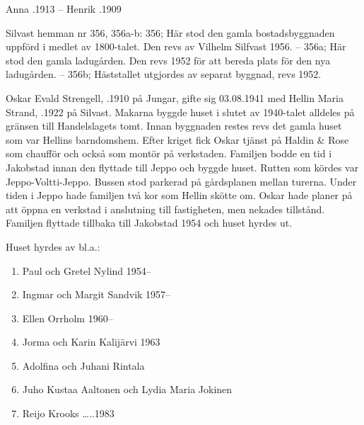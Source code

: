 Anna .1913  --  Henrik .1909

Silvast hemman nr 356, 356a-b:
356; Här stod den gamla bostadsbyggnaden uppförd i medlet av 1800-talet. Den revs av Vilhelm Silfvast 1956. -- 356a; Här stod den gamla ladugården. Den revs 1952 för att bereda plats för den nya ladugården. -- 356b; Häststallet utgjordes av separat byggnad, revs 1952.





Oskar Evald Strengell, .1910 på Jungar, gifte sig 03.08.1941 med Hellin Maria Strand, .1922 på Silvast. Makarna byggde huset i slutet av 1940-talet alldeles på gränsen till Handelslagets tomt. Innan byggnaden restes revs det gamla huset som var Hellins barndomshem. Efter kriget fick Oskar tjänst på Haldin \& Rose som chaufför och också som montör på verkstaden. Familjen bodde en tid i Jakobstad innan den flyttade till Jeppo och byggde huset. Rutten som kördes var Jeppo-Voltti-Jeppo. Bussen stod parkerad på gårdsplanen mellan turerna. Under tiden i Jeppo hade familjen två kor som Hellin skötte om. Oskar hade planer på att öppna en verkstad i anslutning till fastigheten, men nekades tillstånd. Familjen flyttade tillbaka till Jakobstad 1954 och huset hyrdes ut.
\begin{jhchildren}
  \item {}
  \item {}
\end{jhchildren}


Huset hyrdes av bl.a.:
\begin{enumerate}
  \item Paul och Gretel Nylind  1954--
  \item Ingmar och Margit Sandvik 1957--
  \item Ellen Orrholm 1960--
  \item Jorma och Karin Kalijärvi 1963
  \item Adolfina och Juhani Rintala
  \item Juho Kustaa Aaltonen och Lydia Maria Jokinen
  \item Reijo Krooks   …..1983
\end{enumerate}

